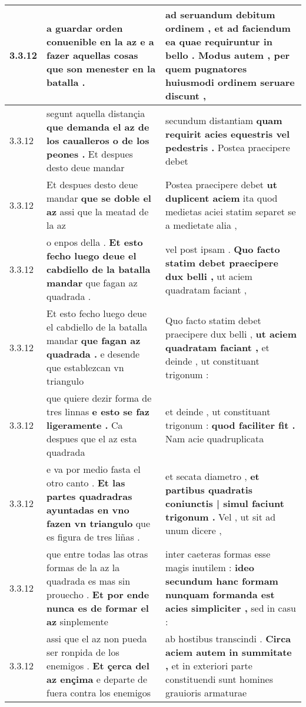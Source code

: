 \begin{tabular}{|p{1cm}|p{6.5cm}|p{6.5cm}|}
3.3.12 & a guardar orden conuenible en la az \textbf{ e a fazer aquellas cosas } que son menester en la batalla . & ad seruandum debitum ordinem , \textbf{ et ad faciendum ea quae requiruntur in bello . Modus autem , } per quem pugnatores huiusmodi ordinem seruare discunt , \\\hline
3.3.12 & segunt aquella distançia \textbf{ que demanda el az de los caualleros o de los peones . } Et despues desto deue mandar & secundum distantiam \textbf{ quam requirit acies equestris vel pedestris . } Postea praecipere debet \\\hline
3.3.12 & Et despues desto deue mandar \textbf{ que se doble el az } assi que la meatad de la az & Postea praecipere debet \textbf{ ut duplicent aciem } ita quod medietas aciei statim separet se a medietate alia , \\\hline
3.3.12 & o enpos della . \textbf{ Et esto fecho luego deue el cabdiello de la batalla mandar } que fagan az quadrada . & vel post ipsam . \textbf{ Quo facto statim debet praecipere dux belli , } ut aciem quadratam faciant , \\\hline
3.3.12 & Et esto fecho luego deue el cabdiello de la batalla mandar \textbf{ que fagan az quadrada . } e desende que establezcan vn triangulo & Quo facto statim debet praecipere dux belli , \textbf{ ut aciem quadratam faciant , } et deinde , ut constituant trigonum : \\\hline
3.3.12 & que quiere dezir forma de tres linnas \textbf{ e esto se faz ligeramente . } Ca despues que el az esta quadrada & et deinde , ut constituant trigonum : \textbf{ quod faciliter fit . } Nam acie quadruplicata \\\hline
3.3.12 & e va por medio fasta el otro canto . \textbf{ Et las partes quadradras ayuntadas en vno fazen vn triangulo } que es figura de tres liñas . & et secata diametro , \textbf{ et partibus quadratis coniunctis | simul faciunt trigonum . } Vel , ut sit ad unum dicere , \\\hline
3.3.12 & que entre todas las otras formas de la az la quadrada es mas sin prouecho . \textbf{ Et por ende nunca es de formar el az } sinplemente & inter caeteras formas esse magis inutilem : \textbf{ ideo secundum hanc formam nunquam formanda est acies simpliciter , } sed in casu : \\\hline
3.3.12 & assi que el az non pueda ser ronpida de los enemigos . \textbf{ Et çerca del az ençima } e departe de fuera contra los enemigos & ab hostibus transcindi . \textbf{ Circa aciem autem in summitate , } et in exteriori parte constituendi sunt homines grauioris armaturae \\\hline

\end{tabular}
